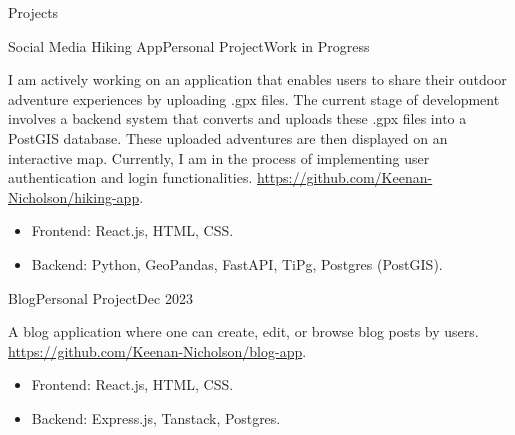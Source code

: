 \documentclass[]{Keenan-Nicholson-Resume}
\begin{document}
\begin{section}{Projects}
\begin{subsectionnobullet}{Social Media Hiking App}{Personal Project}{Work in Progress}{}
    \item{I am actively working on an application that enables users to share their outdoor adventure experiences by uploading .gpx files. The current stage of development involves a backend system that converts and uploads these .gpx files into a PostGIS database. These uploaded adventures are then displayed on an interactive map. Currently, I am in the process of implementing user authentication and login functionalities. \href{https://github.com/Keenan-Nicholson/hiking-app}{https://github.com/Keenan-Nicholson/hiking-app}.}
        \vspace{-4pt}
        \begin{itemize}[itemsep=-6.5pt]
            \item Frontend: React.js, HTML, CSS.
            \item Backend: Python, GeoPandas, FastAPI, TiPg, Postgres (PostGIS).
        \end{itemize}
\end{subsectionnobullet}

\begin{subsectionnobullet}{Blog}{Personal Project}{Dec 2023}{}
    \item{A blog application where one can create, edit, or browse blog posts by users. \href{https://github.com/Keenan-Nicholson/blog-app}{https://github.com/Keenan-Nicholson/blog-app}.}
            \vspace{-4pt}
        \begin{itemize}[itemsep=-6.5pt]
            \item Frontend: React.js, HTML, CSS.
            \item Backend: Express.js, Tanstack, Postgres.
        \end{itemize}
\end{subsectionnobullet}

\end{section}

\end{document}

